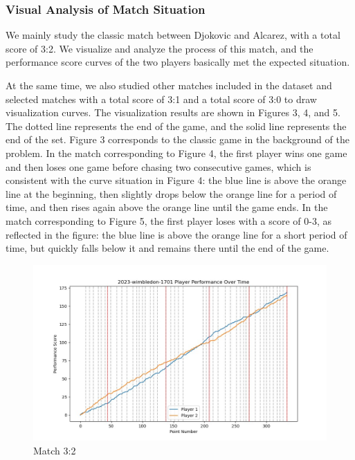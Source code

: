 \documentclass{mcmthesis}
\begin{document}
\subsubsection{Visual Analysis of Match Situation}
We mainly study the classic match between Djokovic and  Alcarez, with a total score of 3:2. We visualize and analyze the process of this match, and the performance score curves of the two players basically met the expected situation. 

At the same time, we also studied other matches included in the dataset and selected matches with a total score of 3:1 and a total score of 3:0 to draw visualization curves. The visualization results are shown in Figures 3, 4, and 5. The dotted line represents the end of the game, and the solid line represents the end of the set. Figure 3 corresponds to the classic game in the background of the problem. In the match corresponding to Figure 4, the first player wins one game and then loses one game before chasing two consecutive games, which is consistent with the curve situation in Figure 4: the blue line is above the orange line at the beginning, then slightly drops below the orange line for a period of time, and then rises again above the orange line until the game ends. In the match corresponding to Figure 5, the first player loses with a score of 0-3, as reflected in the figure: the blue line is above the orange line for a short period of time, but quickly falls below it and remains there until the end of the game.

\begin{figure}[h]
\centering
\includegraphics[width=12cm]{figures/32.JPG}
\caption{Match 3:2} \label{fig:aa}
\end{figure}
\end{document}
